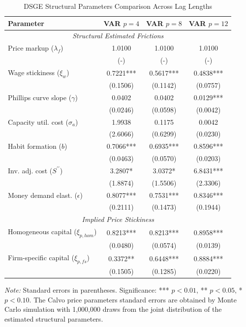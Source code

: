 \begin{table}[htpb]
    \centering
    \small
    \renewcommand{\arraystretch}{1.2}
    \caption{DSGE Structural Parameters Comparison Across Lag Lengths}
    \label{tab:dsge_params_comparison_4_8_12}
    \begin{tabular}{lccc}
    \toprule
    \textbf{Parameter} & \textbf{VAR $p=4$} & \textbf{VAR $p=8$} & \textbf{VAR $p=12$} \\
    \midrule \multicolumn{4}{c}{\textit{Structural Estimated Frictions}} \\
    Price markup ($\lambda_f$) & 1.0100 & 1.0100 & 1.0100 \\
    & (-) & (-) & (-) \\
    Wage stickiness ($\xi_w$) & 0.7221*** & 0.5617*** & 0.4838*** \\
    & (0.1506) & (0.1142) & (0.0757) \\
    Phillips curve slope ($\gamma$) & 0.0402 & 0.0402 & 0.0129*** \\
    & (0.0246) & (0.0598) & (0.0042) \\
    Capacity util. cost ($\sigma_a$) & 1.9938 & 0.1175 & 0.0042 \\
    & (2.6066) & (0.6299) & (0.0230) \\
    Habit formation ($b$) & 0.7066*** & 0.6935*** & 0.8596*** \\
    & (0.0463) & (0.0570) & (0.0203) \\
    Inv. adj. cost ($S^{\prime\prime}$) & 3.2807* & 3.0372* & 6.8431*** \\
    & (1.8874) & (1.5506) & (2.3306) \\
    Money demand elast. ($\epsilon$) & 0.8077*** & 0.7531*** & 0.8346*** \\
    & (0.2111) & (0.1473) & (0.1944) \\
    \midrule \multicolumn{4}{c}{\textit{Implied Price Stickiness}} \\
    Homogeneous capital ($\xi_{p, hom}$) & 0.8213*** & 0.8213*** & 0.8958*** \\
    & (0.0480) & (0.0574) & (0.0139) \\
    Firm-specific capital ($\xi_{p, fs}$) & 0.3372** & 0.6448*** & 0.8884*** \\
    & (0.1505) & (0.1285) & (0.0220) \\
    \bottomrule
    \end{tabular}

    \vspace{0.2cm}
    \raggedright
    \scriptsize{\textit{Note:} Standard errors in parentheses. Significance: *** $p<0.01$, ** $p<0.05$, * $p<0.10$. The Calvo price parameters standard errors are obtained by Monte Carlo simulation with 1{,}000{,}000 draws from the joint distribution of the estimated structural parameters.}
\end{table}
